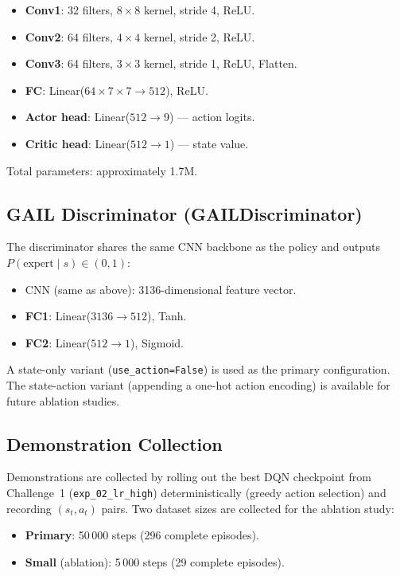 \documentclass[conference]{IEEEtran}
\begin{document}
\begin{itemize}
  \item \textbf{Conv1}: 32 filters, $8\times8$ kernel, stride 4, ReLU.
  \item \textbf{Conv2}: 64 filters, $4\times4$ kernel, stride 2, ReLU.
  \item \textbf{Conv3}: 64 filters, $3\times3$ kernel, stride 1, ReLU, Flatten.
  \item \textbf{FC}: Linear($64\!\times\!7\!\times\!7 \to 512$), ReLU.
  \item \textbf{Actor head}: Linear($512 \to 9$) — action logits.
  \item \textbf{Critic head}: Linear($512 \to 1$) — state value.
\end{itemize}

Total parameters: approximately 1.7M.

\subsection{GAIL Discriminator (GAILDiscriminator)}

The discriminator shares the same CNN backbone as the policy and outputs
$P(\text{expert} \mid s) \in (0,1)$:

\begin{itemize}
  \item CNN (same as above): 3136-dimensional feature vector.
  \item \textbf{FC1}: Linear($3136 \to 512$), Tanh.
  \item \textbf{FC2}: Linear($512 \to 1$), Sigmoid.
\end{itemize}

A state-only variant (\texttt{use\_action=False}) is used as the primary configuration.
The state-action variant (appending a one-hot action encoding) is available for future
ablation studies.

\subsection{Demonstration Collection}

Demonstrations are collected by rolling out the best DQN checkpoint from Challenge~1
(\texttt{exp\_02\_lr\_high}) deterministically (greedy action selection) and recording
$(s_t, a_t)$ pairs.
Two dataset sizes are collected for the ablation study:
\begin{itemize}
  \item \textbf{Primary}: 50\,000 steps (296 complete episodes).
  \item \textbf{Small} (ablation): 5\,000 steps (29 complete episodes).
\end{itemize}
\end{document}
